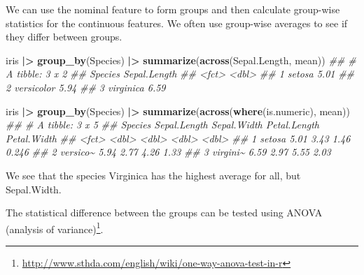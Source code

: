 \documentclass[
  notitlepage]{book}
\newenvironment{Shaded}{\begin{snugshade}}{\end{snugshade}}
\newcommand{\CommentTok}[1]{\textcolor[rgb]{0.56,0.35,0.01}{\textit{#1}}}
\newcommand{\ErrorTok}[1]{\textcolor[rgb]{0.64,0.00,0.00}{\textbf{#1}}}
\newcommand{\KeywordTok}[1]{\textcolor[rgb]{0.13,0.29,0.53}{\textbf{#1}}}
\newcommand{\NormalTok}[1]{#1}
\newcommand{\OperatorTok}[1]{\textcolor[rgb]{0.81,0.36,0.00}{\textbf{#1}}}
\newcommand{\StringTok}[1]{\textcolor[rgb]{0.31,0.60,0.02}{#1}}
\DeclareRobustCommand{\href}[2]{#2\footnote{\url{#1}}}
\begin{document}
We can use the nominal feature to form groups and then calculate
group-wise statistics for the continuous features. We often use
group-wise averages to see if they differ between groups.

\begin{Shaded}
\begin{Highlighting}[]
\NormalTok{iris }\OperatorTok{|}\ErrorTok{\textgreater{}}\StringTok{ }
\StringTok{  }\KeywordTok{group\_by}\NormalTok{(Species) }\OperatorTok{|}\ErrorTok{\textgreater{}}\StringTok{ }
\StringTok{  }\KeywordTok{summarize}\NormalTok{(}\KeywordTok{across}\NormalTok{(Sepal.Length, mean))}
\CommentTok{\#\# \# A tibble: 3 x 2}
\CommentTok{\#\#   Species    Sepal.Length}
\CommentTok{\#\#   \textless{}fct\textgreater{}             \textless{}dbl\textgreater{}}
\CommentTok{\#\# 1 setosa             5.01}
\CommentTok{\#\# 2 versicolor         5.94}
\CommentTok{\#\# 3 virginica          6.59}
\end{Highlighting}
\end{Shaded}

\begin{Shaded}
\begin{Highlighting}[]
\NormalTok{iris }\OperatorTok{|}\ErrorTok{\textgreater{}}\StringTok{ }
\StringTok{  }\KeywordTok{group\_by}\NormalTok{(Species) }\OperatorTok{|}\ErrorTok{\textgreater{}}\StringTok{ }
\StringTok{  }\KeywordTok{summarize}\NormalTok{(}\KeywordTok{across}\NormalTok{(}\KeywordTok{where}\NormalTok{(is.numeric), mean))}
\CommentTok{\#\# \# A tibble: 3 x 5}
\CommentTok{\#\#   Species  Sepal.Length Sepal.Width Petal.Length Petal.Width}
\CommentTok{\#\#   \textless{}fct\textgreater{}           \textless{}dbl\textgreater{}       \textless{}dbl\textgreater{}        \textless{}dbl\textgreater{}       \textless{}dbl\textgreater{}}
\CommentTok{\#\# 1 setosa           5.01        3.43         1.46       0.246}
\CommentTok{\#\# 2 versico\textasciitilde{}         5.94        2.77         4.26       1.33 }
\CommentTok{\#\# 3 virgini\textasciitilde{}         6.59        2.97         5.55       2.03}
\end{Highlighting}
\end{Shaded}

We see that the species Virginica has the highest average for all, but
Sepal.Width.

The statistical difference between the groups can be tested using \href{http://www.sthda.com/english/wiki/one-way-anova-test-in-r}{ANOVA
(analysis of
variance)}.
\end{document}
